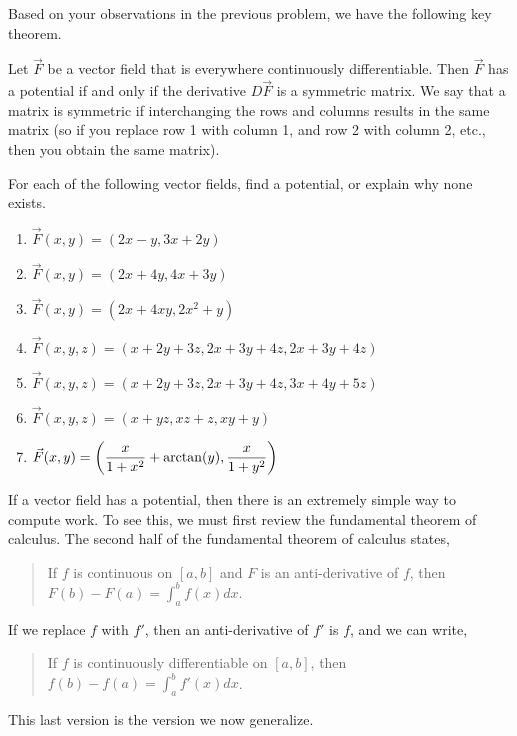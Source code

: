 Based on your observations in the previous problem, we have the following key theorem.

\begin{theorem}
 Let $\vec F$ be a vector field that is everywhere continuously differentiable. Then $\vec F$ has a potential if and only if the derivative $D\vec F$ is a symmetric matrix. We say that a matrix is symmetric if interchanging the rows and columns results in the same matrix (so if you replace row 1 with column 1, and row 2 with column 2, etc., then you obtain the same matrix).  
\end{theorem}

\begin{problem}
%
For each of the following vector fields, find a potential, or explain why none exists.
\begin{enumerate}
 \item $\vec F(x,y)=(2x-y, 3x+2y)$
 \item $\vec F(x,y)=(2x+4y, 4x+3y)$
 \item $\vec F(x,y)=(2x+4xy, 2x^2+y)$
 \item $\vec F(x,y,z)=(x+2y+3z,2x+3y+4z,2x+3y+4z)$
 \item $\vec F(x,y,z)=(x+2y+3z,2x+3y+4z,3x+4y+5z)$
 \item $\vec F(x,y,z)=(x+yz,xz+z,xy+y)$
 \item $\displaystyle \vec F(x,y) = \left(\frac{x}{1+x^2}+\arctan (y),\frac{x}{1+y^2}\right)$
\end{enumerate}
\end{problem}


If a vector field has a potential, then there is an extremely simple way to compute work. To see this, we must first review the fundamental theorem of calculus. The second half of the fundamental theorem of calculus states,
\begin{quote}
 If $f$ is continuous on $[a,b]$ and $F$ is an anti-derivative of $f$, then $F(b)-F(a) = \int_a^b f(x) dx$.
\end{quote}
If we replace $f$ with $f'$, then an anti-derivative of $f'$ is $f$, and we can write,
\begin{quote}
 If $f$ is continuously differentiable on $[a,b]$, then $f(b)-f(a)=\int_a^b f'(x) dx$.
\end{quote}
This last version is the version we now generalize.


